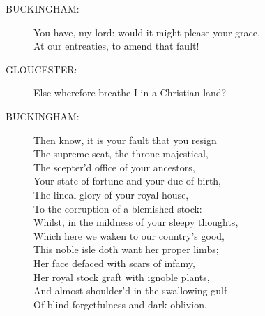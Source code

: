 \documentclass{article}
\begin{document}
\begin{description}
\item[BUCKINGHAM:] 
\hspace{1pt}You have, my lord: would it might please your grace,\\
\hspace{1pt}At our entreaties, to amend that fault!\\
\end{description}
\begin{description}
\item[GLOUCESTER:] 
\hspace{1pt}Else wherefore breathe I in a Christian land?\\
\end{description}
\begin{description}
\item[BUCKINGHAM:] 
\hspace{1pt}Then know, it is your fault that you resign\\
\hspace{1pt}The supreme seat, the throne majestical,\\
\hspace{1pt}The scepter'd office of your ancestors,\\
\hspace{1pt}Your state of fortune and your due of birth,\\
\hspace{1pt}The lineal glory of your royal house,\\
\hspace{1pt}To the corruption of a blemished stock:\\
\hspace{1pt}Whilst, in the mildness of your sleepy thoughts,\\
\hspace{1pt}Which here we waken to our country's good,\\
\hspace{1pt}This noble isle doth want her proper limbs;\\
\hspace{1pt}Her face defaced with scars of infamy,\\
\hspace{1pt}Her royal stock graft with ignoble plants,\\
\hspace{1pt}And almost shoulder'd in the swallowing gulf\\
\hspace{1pt}Of blind forgetfulness and dark oblivion.\\

\end{description}
\end{document}
